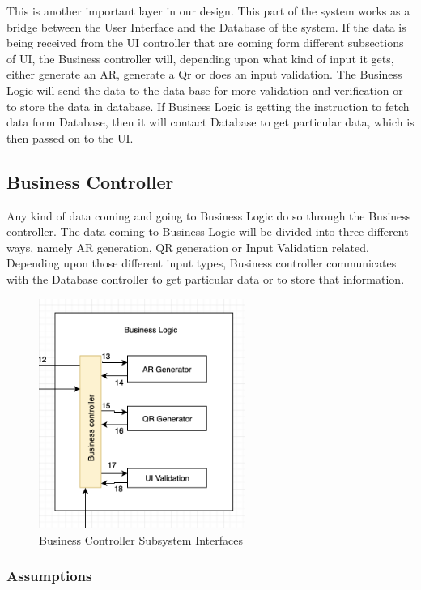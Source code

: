 
This is another important layer in our design. This part of the system works as a bridge between the User Interface and the Database of the system. If the data is being received from the UI controller that are coming form different subsections of UI, the Business controller will, depending upon what kind of input it gets, either generate an AR, generate a Qr or does an input validation. The Business Logic will send the data to the data base for more validation and verification or to store the data in database. If Business Logic is getting the instruction to fetch data form Database, then it will contact Database to get particular data, which is then passed on to the UI.

\subsection{Business Controller}
Any kind of data coming and going to Business Logic do so through the Business controller. The data coming to Business Logic will be divided into three different ways, namely AR generation, QR generation or Input Validation related. Depending upon those different input types, Business controller communicates with the Database controller to get particular data or to store that information.

\begin{figure}[h!]
	\centering
 	\includegraphics[width=0.60\textwidth]{images/businesscontroller}
 \caption{Business Controller Subsystem Interfaces}
\end{figure}

\subsubsection{Assumptions}

